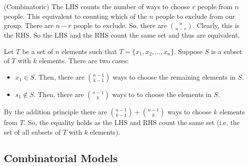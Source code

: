\documentclass{report}
\begin{document}
\begin{subproof}{(Combinatoric)}
    The LHS counts the number of ways to choose $r$ people from $n$ people. 
    This equivalent to counting which of the $n$ people to exclude from our 
    group. There are $n-r$ people to exclude. So, there are $\binom{n}{n-r}$. 
    Clearly, this is the RHS. So the LHS and the RHS count the same set and thus 
    are equivalent. 
\end{subproof}

\begin{subproof}
    Let $T$ be a set of $n$ elements such that $T=\{x_1, x_2, \dots, x_n\}$. Suppose $S$ is a subset of $T$ with 
    $k$ elements. There are two cases: 

    \begin{itemize}
        \item $x_1 \in S$. Then, there are $\binom{n-1}{k-1}$ ways 
        to choose the remaining elements in $S$. 
        \item $s_1 \not\in S$. Then, there are $\binom{n-1}{k}$ ways to
        to choose the elements in $S$. 
    \end{itemize}

    By the addition principle there are $\binom{n-1}{k-1} + \binom{n-1}{k}$ ways 
    to choose $k$ elements from $T$. So, the equality holds as the LHS and RHS 
    count the same set (i.e. the set of all subsets of $T$ with $k$ elements).
\end{subproof}

\subsection*{Combinatorial Models}

\end{document}
